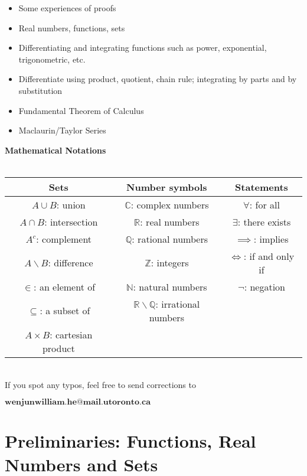 \documentclass{book}
\begin{document}
\vspace{-2mm}
\begin{itemize}
        \item Some experiences of proofs
        \item Real numbers, functions, sets
        \item Differentiating and integrating functions such as power, exponential, trigonometric, etc.
        \item Differentiate using product, quotient, chain rule; integrating by parts and by substitution
        \item Fundamental Theorem of Calculus
        \item Maclaurin/Taylor Series
\end{itemize}
\begin{center}
    \textbf{\large Mathematical Notations} \ \\
    \ \\
    \begin{tabular}{c|c|c}
        Sets & Number symbols & Statements \\
        \hline
        $A \cup B$: union & $\mathbb{C}$: complex numbers & $\forall$: for all \\
        $A \cap B$: intersection & $\mathbb{R}$: real numbers & $\exists$: there exists \\
        $A^{c}$: complement & $\mathbb{Q}$: rational numbers & $\implies$: implies \\
        $A \backslash B$: difference & $\mathbb{Z}$: integers & $\iff$: if and only if \\
        $\in$: an element of & $\mathbb{N}$: natural numbers & $\neg$: negation \\
        $\subseteq$: a subset of & $\mathbb{R} \backslash \mathbb{Q}$: irrational numbers & \ \\
        $A \times B$: cartesian product & \ & \ \\
\end{tabular}
\end{center}
\ \\
\indent If you spot any typos, feel free to send corrections to

\begin{center}
    $\mathbf{wenjunwilliam.he@mail.utoronto.ca}$
\end{center}

\mainmatter

\chapter{Preliminaries: Functions, Real Numbers and Sets}
\end{document}
